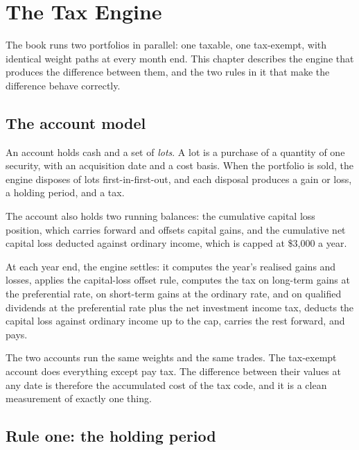 
\chapter{The Tax Engine}
\label{ch:tax-engine}

The book runs two portfolios in parallel: one taxable, one tax-exempt,
with identical weight paths at every month end. This chapter describes
the engine that produces the difference between them, and the two rules
in it that make the difference behave correctly.

\section{The account model}

An account holds cash and a set of \emph{lots}. A lot is a purchase of a
quantity of one security, with an acquisition date and a cost basis. When
the portfolio is sold, the engine disposes of lots first-in-first-out, and
each disposal produces a gain or loss, a holding period, and a tax.

The account also holds two running balances: the cumulative capital loss
position, which carries forward and offsets capital gains, and the
cumulative net capital loss deducted against ordinary income, which is
capped at \$3,000 a year.

At each year end, the engine settles: it computes the year's realised
gains and losses, applies the capital-loss offset rule, computes the tax
on long-term gains at the preferential rate, on short-term gains at the
ordinary rate, and on qualified dividends at the preferential rate plus
the net investment income tax, deducts the capital loss against ordinary
income up to the cap, carries the rest forward, and pays.

The two accounts run the same weights and the same trades. The tax-exempt
account does everything except pay tax. The difference between their
values at any date is therefore the accumulated cost of the tax code, and
it is a clean measurement of exactly one thing.

\section{Rule one: the holding period}

